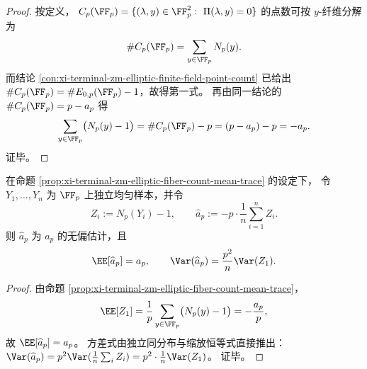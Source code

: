 \begin{proof}
按定义，
\(
C_p(\FF_p)=\{(\lambda,y)\in\FF_p^2:\ \Pi(\lambda,y)=0\}
\)
的点数可按 \(y\)-纤维分解为
\[
\#C_p(\FF_p)=\sum_{y\in\FF_p}N_p(y).
\]
而结论 \ref{con:xi-terminal-zm-elliptic-finite-field-point-count} 已给出 \(\#C_p(\FF_p)=\#E_{0,p}(\FF_p)-1\)，故得第一式。
再由同一结论的 \(\#C_p(\FF_p)=p-a_p\) 得
\[
\sum_{y\in\FF_p}\bigl(N_p(y)-1\bigr)
=\#C_p(\FF_p)-p
=(p-a_p)-p
=-a_p.
\]
证毕。
\end{proof}

\begin{corollary}\label{cor:xi-terminal-zm-elliptic-mc-trace-estimator}
在命题 \ref{prop:xi-terminal-zm-elliptic-fiber-count-mean-trace} 的设定下，
令 \(Y_1,\dots,Y_n\) 为 \(\FF_p\) 上独立均匀样本，并令
\[
Z_i:=N_p(Y_i)-1,
\qquad
\widehat a_p:=-p\cdot \frac{1}{n}\sum_{i=1}^{n} Z_i.
\]
则 \(\widehat a_p\) 为 \(a_p\) 的无偏估计，且
\[
\EE[\widehat a_p]=a_p,
\qquad
\Var(\widehat a_p)=\frac{p^{2}}{n}\Var(Z_1).
\]
\end{corollary}

\begin{proof}
由命题 \ref{prop:xi-terminal-zm-elliptic-fiber-count-mean-trace}，
\[
\EE[Z_1]
=\frac{1}{p}\sum_{y\in\FF_p}\bigl(N_p(y)-1\bigr)
=-\frac{a_p}{p},
\]
故 \(\EE[\widehat a_p]=a_p\)。
方差式由独立同分布与缩放恒等式直接推出：
\(
\Var(\widehat a_p)
=p^2\Var(\frac1n\sum_i Z_i)
=p^2\cdot \frac{1}{n}\Var(Z_1)
\)。
证毕。
\end{proof}
